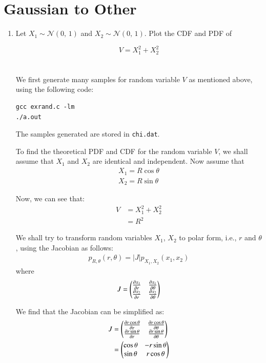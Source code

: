 \documentclass[journal,12pt,twocolumn]{IEEEtran}
\renewcommand\thesection{\arabic{section}}
\begin{document}
\section{Gaussian to Other}
\begin{enumerate}[label=\thesection.\arabic*
,ref=\thesection.\theenumi]

\item Let $X_1 \sim \mathcal{N}(0,\,1)$ and $X_2 \sim \mathcal{N}(0,\,1)$. Plot the CDF and PDF of
	
	\begin{equation}
	V = X_1^2 + X_2^2
	\end{equation}
	\\
	\solution
	\\
	We first generate many samples for random variable $V$ as mentioned above, using the following code:
	\begin{lstlisting}
gcc exrand.c -lm
./a.out
	\end{lstlisting}
	The samples generated are stored in \verb|chi.dat|.

	To find the theoretical PDF and CDF for the random variable $V$, we shall assume that $X_1$ and $X_2$ are identical and independent. Now assume that
	\begin{align}
		X_1 = R \cos{\theta} \\
		X_2 = R \sin{\theta}
	\end{align}

	Now, we can see that:
	\begin{align}
		V &= X_1^2 + X_2^2 \\
		&= R^2
		\label{eq:RelationVR}
	\end{align}

	We shall try to transform random variables $X_1$, $X_2$ to polar form, i.e., $r$ and $\theta$, using the Jacobian as follows:
	\begin{align}
		p_{R,\theta}(r, \theta) = |J|p_{X_1, X_2}(x_1, x_2)
		\label{eq:Transform}
	\end{align}
	where
	\begin{align}
		J = \begin{pmatrix}\frac{\partial x_1}{\partial r}& \frac{\partial x_1}{\partial \theta} \\ \frac{\partial x_2}{\partial r} & \frac{\partial x_2}{\partial \theta}\end{pmatrix}
	\end{align}

	We find that the Jacobian can be simplified as:
	\begin{align}
		J &= \begin{pmatrix} \frac{\partial r \cos{\theta}}{\partial r} & \frac{\partial r \cos{\theta}}{\partial \theta} \\ \frac{\partial r \sin{\theta}}{\partial r} & \frac{\partial r \sin{\theta}}{\partial \theta}\end{pmatrix} \\
		&= \begin{pmatrix}\cos{\theta} & -r\sin{\theta} \\ \sin{\theta} & r\cos{\theta}\end{pmatrix} 
	\end{align}


\end{enumerate}
\end{document}
